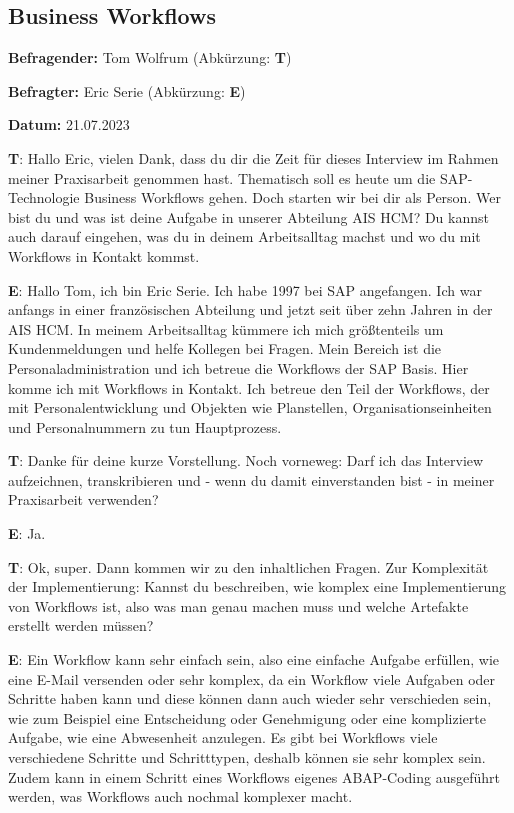 \subsection*{Business Workflows} \label{T_Workflows}

\textbf{Befragender:} Tom Wolfrum (Abkürzung: \textbf{T})

\textbf{Befragter:} Eric Serie (Abkürzung: \textbf{E})

\textbf{Datum:} 21.07.2023

\begin{list}{X:}{\setlength{\labelsep}{5mm}}
 \linenumbers[1]
 \item[\textbf{T}:] Hallo Eric, vielen Dank, dass du dir die Zeit für dieses Interview im Rahmen meiner Praxisarbeit genommen hast. Thematisch soll es heute um die SAP-Technologie Business Workflows gehen. Doch starten wir bei dir als Person. Wer bist du und was ist deine Aufgabe in unserer Abteilung AIS HCM? Du kannst auch darauf eingehen, was du in deinem Arbeitsalltag machst und wo du mit Workflows in Kontakt kommst.
 \item[\textbf{E}:] Hallo Tom, ich bin Eric Serie. Ich habe 1997 bei SAP angefangen. Ich war anfangs in einer französischen Abteilung und jetzt seit über zehn Jahren in der AIS HCM. In meinem Arbeitsalltag kümmere ich mich grö{\ss}tenteils um Kundenmeldungen und helfe Kollegen bei Fragen. Mein Bereich ist die Personaladministration und ich betreue die Workflows der SAP Basis. Hier komme ich mit Workflows in Kontakt. Ich betreue den Teil der Workflows, der mit Personalentwicklung und Objekten wie Planstellen, Organisationseinheiten und Personalnummern zu tun Hauptprozess.
 \item[\textbf{T}:] Danke für deine kurze Vorstellung. Noch vorneweg: Darf ich das Interview aufzeichnen, transkribieren und - wenn du damit einverstanden bist - in meiner Praxisarbeit verwenden? 
 \item[\textbf{E}:] Ja.
 \item[\textbf{T}:] Ok, super. Dann kommen wir zu den inhaltlichen Fragen. Zur Komplexität der Implementierung: Kannst du beschreiben, wie komplex eine Implementierung von Workflows ist, also was man genau machen muss und welche Artefakte erstellt werden müssen?
 \item[\textbf{E}:] Ein Workflow kann sehr einfach sein, also eine einfache Aufgabe erfüllen, wie \zB eine E-Mail versenden oder sehr komplex, da ein Workflow viele Aufgaben oder Schritte haben kann und diese können dann auch wieder sehr verschieden sein, wie zum Beispiel eine Entscheidung oder Genehmigung oder eine komplizierte Aufgabe, wie eine Abwesenheit anzulegen. Es gibt bei Workflows viele verschiedene Schritte und Schritttypen, deshalb können sie sehr komplex sein. Zudem kann in einem Schritt eines Workflows eigenes ABAP-Coding ausgeführt werden, was Workflows auch nochmal komplexer macht.

\end{list}
